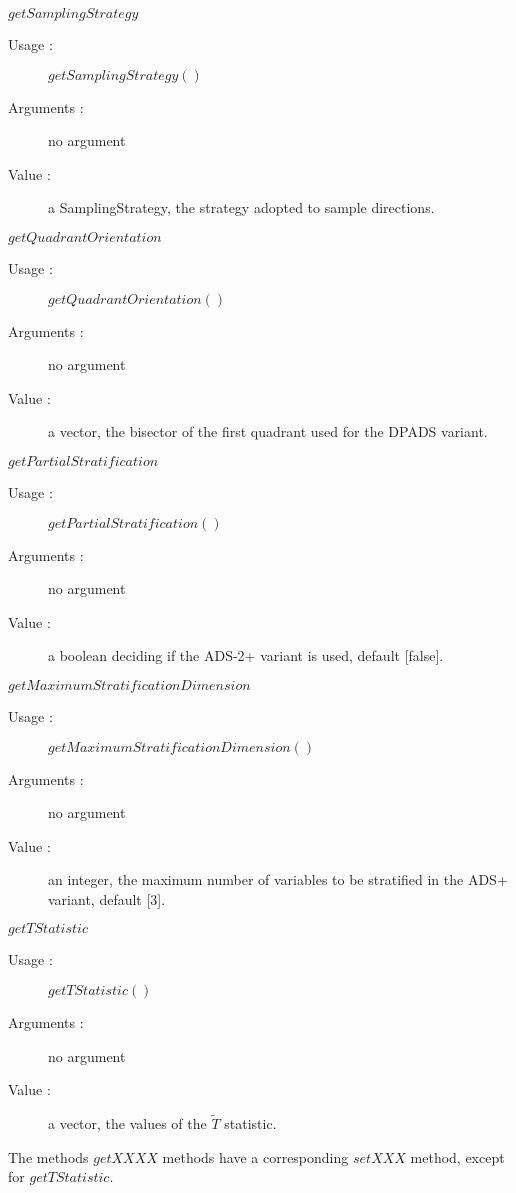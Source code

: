 \begin{description}
\item $getSamplingStrategy$
    \begin{description}
    \item[Usage :] $getSamplingStrategy()$
    \item[Arguments :] no argument
    \item[Value :] a SamplingStrategy, the strategy adopted to sample directions.
    \end{description}
    \bigskip
    
\item $getQuadrantOrientation$
    \begin{description}
    \item[Usage :] $getQuadrantOrientation()$
    \item[Arguments :] no argument
    \item[Value :] a vector, the bisector of the first quadrant used for the DPADS variant.
    \end{description}
    \bigskip    
    
 \item $getPartialStratification$
    \begin{description}
    \item[Usage :] $getPartialStratification()$
    \item[Arguments :] no argument
    \item[Value :] a boolean deciding if the ADS-2+ variant is used, default [false].
    \end{description}
    \bigskip     
    
\item $getMaximumStratificationDimension$
    \begin{description}
    \item[Usage :] $getMaximumStratificationDimension()$
    \item[Arguments :] no argument
    \item[Value :] an integer, the maximum number of variables to be stratified in the ADS+ variant, default [3].
    \end{description}
    \bigskip 
    
  \item $getTStatistic$
    \begin{description}
    \item[Usage :] $getTStatistic()$
    \item[Arguments :] no argument
    \item[Value :] a vector, the values of the $\tilde T$ statistic.
    \end{description}
    \bigskip   
    
The methods $getXXXX$ methods have a corresponding $setXXX$ method, except for $getTStatistic$.

\item[Links] \rule{0pt}{1em}
\end{description}

